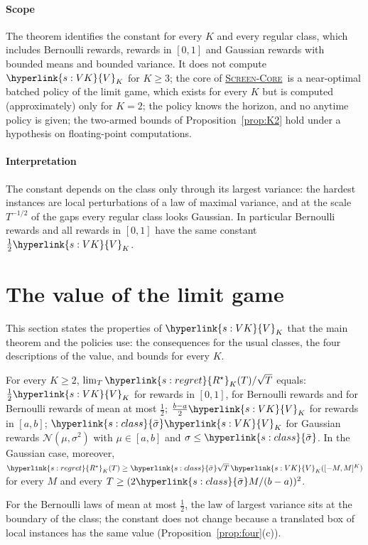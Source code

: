 \documentclass[11pt]{article}
\DeclareRobustCommand{\sy}[2]{{\hyperlink{#1}{#2}}}
\newcommand{\1}{\mathbf{1}}
\newcommand{\Rs}{\sy{s:regret}{R^\star}}
\newcommand{\sbar}{\sy{s:class}{\bar\sigma}}
\newcommand{\VK}{\sy{s:VK}{V}}
\newcommand{\SC}{\sy{alg:sc}{\textsc{Screen-Core}}}
\begin{document}
\paragraph{Scope} The theorem identifies the constant for every $K$ and every regular class, which includes Bernoulli rewards, rewards in $[0,1]$ and
Gaussian rewards with bounded means and bounded variance. It does not compute $\VK_K$ for $K\ge3$; the core of \SC\ is a near-optimal batched policy of the
limit game, which exists for every $K$ but is computed (approximately) only for $K=2$; the policy knows the horizon, and no anytime policy is given; the
two-armed bounds of Proposition~\ref{prop:K2} hold under a hypothesis on floating-point computations.

\paragraph{Interpretation} The constant depends on the class only through its largest variance: the hardest instances are local perturbations of a law
of maximal variance, and at the scale $T^{-1/2}$ of the gaps every regular class looks Gaussian. In particular Bernoulli rewards and all rewards in
$[0,1]$ have the same constant $\frac12\VK_K$.

\section{The value of the limit game}\label{sec:results}

This section states the properties of $\VK_K$ that the main theorem and the policies use: the consequences for the usual classes, the four descriptions
of the value, and bounds for every $K$.

\begin{corollary}[examples]\label{cor:examples}
For every $K\ge2$, $\lim_T\Rs_K(T)/\sqrt T$ equals: $\frac12\VK_K$ for rewards in $[0,1]$, for Bernoulli rewards and for Bernoulli rewards of mean at most $\frac12$;
$\frac{b-a}2\VK_K$ for rewards in $[a,b]$; $\sbar\VK_K$ for Gaussian rewards $\mathcal N(\mu,\sigma^2)$ with $\mu\in[a,b]$ and $\sigma\le\sbar$. In the Gaussian case,
moreover, $\Rs_K(T)\ge\sbar\sqrt T\,\VK_K([-M,M]^K)$ for every $M$ and every $T\ge(2\sbar M/(b-a))^2$.
\end{corollary}

\noindent For the Bernoulli laws of mean at most $\frac12$, the law of largest variance sits at the boundary of the class; the constant does not change because a translated box of
local instances has the same value (Proposition~\ref{prop:four}(c)).
\end{document}
